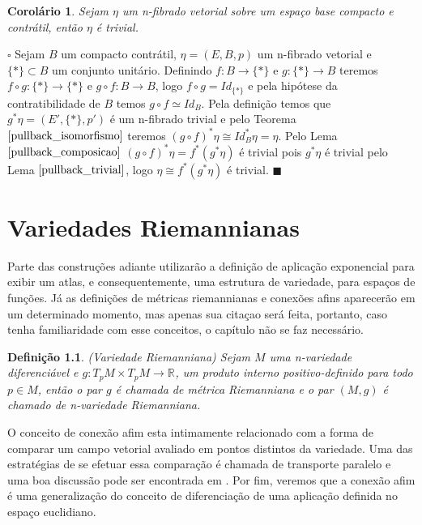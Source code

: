 \documentclass[12pt]{book}
\newtheorem{corolario}[teorema]{Corolário}
\newtheorem{definicao}[teorema]{Definição}
\newenvironment{prova}[1]{$\square$ #1}{\hfill$\blacksquare$}
\newcommand{\real}[1]{\mathbb{R}^{#1}}
\begin{document}
	\begin{corolario}\label{pullback_contratil}
		Sejam $\eta$ um n-fibrado vetorial sobre um espaço base compacto e contrátil, então $\eta$ é trivial.
	\end{corolario}
	\begin{prova}
		Sejam $B$ um compacto contrátil, $\eta=(E, B, p)$ um n-fibrado vetorial e $\{*\} \subset B$ um conjunto unitário. Definindo $f:B\to \{*\}$ e $g:\{*\}\to B$ teremos $f\circ g : \{*\} \to \{*\}$ e $g\circ f:B\to B$, logo $f\circ g = Id_{\{*\}}$ e pela hipótese da contratibilidade de $B$ temos $g\circ f \simeq Id_{B}$. Pela definição temos que $g^{*}\eta = (E', \{*\}, p')$ é um n-fibrado trivial e pelo Teorema $\ref{pullback_isomorfismo}$ teremos $(g\circ f)^{*}\eta \cong Id_{B}^{*}\eta = \eta$. Pelo Lema $\ref{pullback_composicao}$ $(g\circ f)^{*}\eta = f^{*}(g^{*}\eta) $ é trivial pois $g^{*}\eta$ é trivial pelo Lema $\ref{pullback_trivial}$, logo $ \eta \cong f^{*}(g^{*}\eta)$ é trivial.
	\end{prova}
	
	
	\chapter{Variedades Riemannianas}\label{apendice_variedade_riemanniana}
	
	Parte das construções adiante utilizarão a definição de aplicação exponencial para exibir um atlas, e consequentemente, uma estrutura de variedade, para espaços de funções. Já as definições de métricas riemannianas e conexões afins aparecerão em um determinado momento, mas apenas sua citaçao será feita, portanto, caso tenha familiaridade com esse conceitos, o capítulo não se faz necessário.
	
	\begin{definicao}\label{definicao_variedade_riemanniana}
		(Variedade Riemanniana) Sejam $M$ uma n-variedade diferenciável e $g:T_{p}M \times T_{p}M \to \real{}$, um produto interno positivo-definido para todo $p \in M$, então o par $g$ é chamada de métrica Riemanniana e o par $(M, g)$ é chamado de n-variedade Riemanniana.
	\end{definicao}
	
	O conceito de conexão afim esta intimamente relacionado com a forma de comparar um campo vetorial avaliado em pontos distintos da variedade. Uma das estratégias de se efetuar essa comparação é chamada de transporte paralelo e uma boa discussão pode ser encontrada em \cite{nakahara}. Por fim, veremos que a conexão afim é uma generalização do conceito de diferenciação de uma aplicação definida no espaço euclidiano.
	
\end{document}
